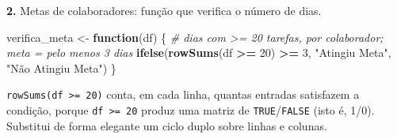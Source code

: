 \documentclass[
  portuguese,
  11pt,
  openany]{book}
\newenvironment{Shaded}{\begin{snugshade}}{\end{snugshade}}
\newcommand{\AttributeTok}[1]{\textcolor[rgb]{0.13,0.29,0.53}{#1}}
\newcommand{\CommentTok}[1]{\textcolor[rgb]{0.56,0.35,0.01}{\textit{#1}}}
\newcommand{\ConstantTok}[1]{\textcolor[rgb]{0.56,0.35,0.01}{#1}}
\newcommand{\ControlFlowTok}[1]{\textcolor[rgb]{0.13,0.29,0.53}{\textbf{#1}}}
\newcommand{\DecValTok}[1]{\textcolor[rgb]{0.00,0.00,0.81}{#1}}
\newcommand{\FunctionTok}[1]{\textcolor[rgb]{0.13,0.29,0.53}{\textbf{#1}}}
\newcommand{\NormalTok}[1]{#1}
\newcommand{\OtherTok}[1]{\textcolor[rgb]{0.56,0.35,0.01}{#1}}
\newcommand{\SpecialCharTok}[1]{\textcolor[rgb]{0.81,0.36,0.00}{\textbf{#1}}}
\newcommand{\StringTok}[1]{\textcolor[rgb]{0.31,0.60,0.02}{#1}}
\begin{document}
\begin{Shaded}
\end{Shaded}

\textbf{2.} Metas de colaboradores: função que verifica o número de dias.

\begin{Shaded}
\begin{Highlighting}[]
\NormalTok{verifica\_meta }\OtherTok{\textless{}{-}} \ControlFlowTok{function}\NormalTok{(df) \{}
  \CommentTok{\# dias com \textgreater{}= 20 tarefas, por colaborador; meta = pelo menos 3 dias}
  \FunctionTok{ifelse}\NormalTok{(}\FunctionTok{rowSums}\NormalTok{(df }\SpecialCharTok{\textgreater{}=} \DecValTok{20}\NormalTok{) }\SpecialCharTok{\textgreater{}=} \DecValTok{3}\NormalTok{, }\StringTok{"Atingiu Meta"}\NormalTok{, }\StringTok{"Não Atingiu Meta"}\NormalTok{)}
\NormalTok{\}}
\end{Highlighting}
\end{Shaded}

\texttt{rowSums(df\ \textgreater{}=\ 20)} conta, em cada linha, quantas entradas satisfazem a condição,
porque \texttt{df\ \textgreater{}=\ 20} produz uma matriz de \texttt{TRUE}/\texttt{FALSE} (isto é, 1/0). Substitui de
forma elegante um ciclo duplo sobre linhas e colunas.
\end{document}
